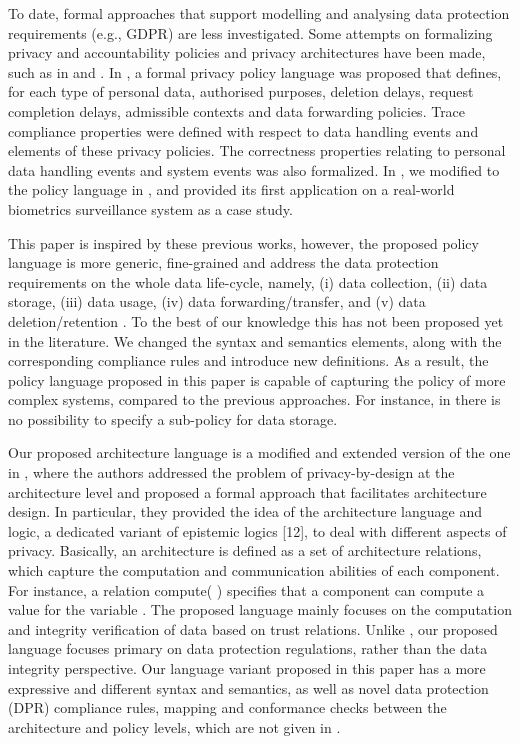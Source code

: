 \documentclass[a4paper]{article}
\begin{document}
To date, formal approaches that support modelling and analysing  
data protection requirements (e.g., GDPR) are less investigated. Some attempts on formalizing privacy and accountability policies and privacy architectures have been made, such as in \cite{TaButin15, ButinFM14} and \cite{TaAntignac14, Antignac14}. In \cite{ButinFM14}, a formal privacy policy language was proposed that defines, for each  type of personal data, authorised purposes, deletion delays, request 
completion delays, admissible contexts and data forwarding policies. Trace compliance properties were defined with respect to data handling events 
and elements of these privacy policies. The correctness properties relating to personal data handling events and system events was also formalized. In \cite{TaButin15}, we modified to the policy language in  \cite{ButinFM14}, and provided its first application on a real-world biometrics surveillance system as a case study.   

This paper is inspired by these previous works, however, the proposed  policy language is more generic, fine-grained and address the data protection requirements on the whole data life-cycle, namely, (i) data collection, (ii) data storage, (iii) data usage, (iv) data forwarding/transfer, and (v) data deletion/retention \cite{ButinTN15}. To the best of our knowledge this has not been proposed yet in the literature. We changed the syntax and semantics elements, along with the corresponding compliance rules and introduce new definitions.  As a result, the policy language proposed in this paper is capable of capturing the policy of more complex systems, compared to the previous approaches. For instance, in \cite{ButinFM14} there is no possibility to specify a sub-policy for data storage. 

Our proposed architecture language is a modified and extended version of the one in \cite{Antignac14}, where the authors addressed the problem of privacy-by-design at the architecture level and proposed a formal approach that facilitates architecture design. In particular, they provided the idea of the architecture language and logic, a dedicated variant of epistemic logics [12], to deal with different aspects of privacy. Basically, an architecture is defined as a set
of architecture relations, which capture the computation and communication 
abilities of each component. For instance, a relation compute(  ) specifies
that a component  can compute a value  for the variable . The proposed language mainly focuses on the computation and integrity verification of data based on trust relations. Unlike \cite{Antignac14}, our proposed language focuses primary on data protection regulations, rather than the data integrity perspective. Our language variant proposed in this paper has a more expressive and different syntax and semantics, as well as novel data protection (DPR) compliance rules,  mapping and conformance checks between the architecture and policy levels, which are not given in \cite{Antignac14}.  
\end{document}
